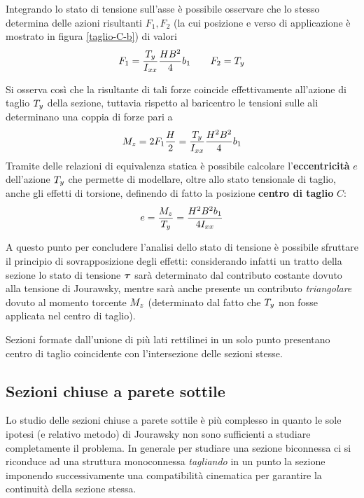 		Integrando lo stato di tensione sull'asse è possibile osservare che lo stesso determina delle azioni risultanti $F_1,F_2$ (la cui posizione e verso di applicazione è mostrato in figura \ref{taglio-C-b}) di valori
		\[ F_1 = \frac {T_y} {I_{xx}} \frac{HB^2}{4}b_1 \qquad F_2 = T_y \]
		
		
		Si osserva così che la risultante di tali forze coincide effettivamente all'azione di taglio $T_y$ della sezione, tuttavia rispetto al baricentro le tensioni sulle ali determinano una coppia di forze pari a
		\[ M_z = 2 F_1 \frac H 2 = \frac {T_y} {I_{xx}} \frac{H^2B^2}{4}b_1 \]
		Tramite delle relazioni di equivalenza statica è possibile calcolare l'\textbf{eccentricità} $e$ dell'azione $T_y$ che permette di modellare, oltre allo stato tensionale di taglio, anche gli effetti di torsione, definendo di fatto la posizione \textbf{centro di taglio} $C$:
		\[ e = \frac {M_z} {T_y} = \frac{H^2B^2b_1}{4I_{xx}} \]
		
		A questo punto per concludere l'analisi dello stato di tensione è possibile sfruttare il principio di sovrapposizione degli effetti: considerando infatti un tratto della sezione lo stato di tensione $\boldsymbol{\tau}$ sarà determinato dal contributo costante dovuto alla tensione di Jourawsky, mentre sarà anche presente un contributo \textit{triangolare} dovuto al momento torcente $M_z$ (determinato dal fatto che $T_y$ non fosse applicata nel centro di taglio).
		
		\begin{osservazione}
			Sezioni formate dall'unione di più lati rettilinei in un solo punto presentano centro di taglio coincidente con l'intersezione delle sezioni stesse.
		\end{osservazione}
		
	\subsection{Sezioni chiuse a parete sottile}
		Lo studio delle sezioni chiuse a parete sottile è più complesso in quanto le sole ipotesi (e relativo metodo) di Jourawsky non sono sufficienti a studiare completamente il problema. In generale per studiare una sezione biconnessa ci si riconduce ad una struttura monoconnessa 	\textit{tagliando} in un punto la sezione imponendo successivamente una compatibilità cinematica per garantire la continuità della sezione stessa.
		
